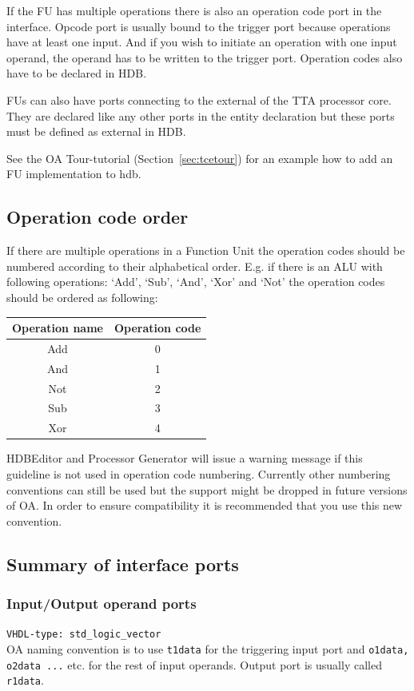 \documentclass[a4paper,twoside]{tceusermanual}
\begin{document}
If the FU has multiple operations there is also an operation code port in the
interface. Opcode port is usually bound to the trigger port because operations
have at least one input. And if you wish to initiate an operation with one
input operand, the operand has to be written to the trigger port. Operation
codes also have to be declared in HDB.

FUs can also have ports connecting to the external of the TTA processor
core. They are declared like any other ports in the entity declaration but
these ports must be defined as external in HDB.

See the OA Tour-tutorial (Section~\ref{sec:tcetour}) for an example how to
add an FU implementation to hdb.

\subsection{Operation code order}
\label{sec:opcodeorder}
If there are multiple operations in a Function Unit the operation codes
should be numbered according to their alphabetical order. E.g. if there is
an ALU with following operations: `Add', `Sub', `And', `Xor' and `Not' the
operation codes should be ordered as following:

\begin{tabular}{|c|c|}
 \hline
 Operation name & Operation code \\ \hline
 Add & 0 \\ \hline
 And & 1 \\ \hline
 Not & 2 \\ \hline
 Sub & 3 \\ \hline
 Xor & 4 \\ \hline
\end{tabular}

HDBEditor and Processor Generator will issue a warning message if this
guideline is not used in operation code numbering. Currently other
numbering conventions can still be used but the support might be dropped
in future versions of OA. In order to ensure compatibility it is recommended
that you use this new convention.


\subsection{Summary of interface ports}
\subsubsection{Input/Output operand ports}
\verb|VHDL-type: std_logic_vector| \\
OA naming convention is to use \verb|t1data| for the triggering input port
and \verb|o1data, o2data ...| etc. for the rest of input operands. Output port
is usually called \verb|r1data|.
\end{document}
